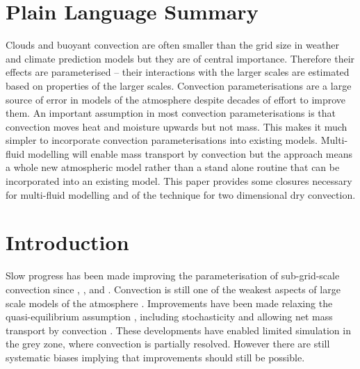\documentclass[draft]{agujournal2019}
\begin{document}
\section*{Plain Language Summary}
Clouds and buoyant convection are often smaller than the grid size in weather and climate prediction models but they are of central importance. Therefore their effects are parameterised -- their interactions with the larger scales are estimated based on properties of the larger scales. Convection parameterisations are a large source of error in models of the atmosphere despite decades of effort to improve them. An important assumption in most convection parameterisations is that convection moves heat and moisture upwards but not mass. This makes it much simpler to incorporate convection parameterisations into existing models. Multi-fluid modelling will enable mass transport by convection but the approach means a whole new atmospheric model rather than a stand alone routine that can be incorporated into an existing model. This paper provides some closures necessary for multi-fluid modelling and  of the technique for two dimensional dry convection.

\section{Introduction \label{sec:intro}}

Slow progress has been made improving the parameterisation of sub-grid-scale
convection since , ,  and . Convection is still
one of the weakest aspects of large scale models of the atmosphere
\cite{HPB+14,SAB+13,ipcc41}. Improvements have been made  relaxing
the quasi-equilibrium assumption \cite{PR98,GG05,Par14}, including
stochasticity \cite{PC08} and allowing net mass transport by convection
\cite{KB08,MB19}. These developments have enabled limited simulation
in the grey zone, where convection is partially resolved. However
there are still systematic biases implying that improvements should
still be possible.

\end{document}
